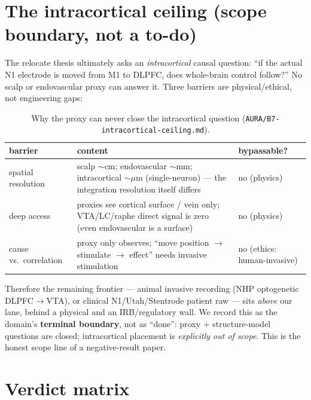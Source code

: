 \documentclass[11pt,a4paper]{article}
\begin{document}
\section{The intracortical ceiling (scope boundary, not a to-do)}
\label{sec:ceiling}

The relocate thesis ultimately asks an \emph{intracortical} causal question:
``if the actual N1 electrode is moved from M1 to DLPFC, does whole-brain
control follow?'' No scalp or endovascular proxy can answer it. Three barriers
are physical/ethical, not engineering gaps:

\begin{table}[h]
\centering
\caption{Why the proxy can never close the intracortical question
(\texttt{AURA/B7-intracortical-ceiling.md}).}
\label{tab:ceiling}
\small
\begin{tabular}{@{}lp{7.2cm}l@{}}
\toprule
barrier & content & bypassable? \\
\midrule
spatial resolution & scalp $\sim$cm; endovascular $\sim$mm; intracortical
$\sim\mu$m (single-neuron) --- the integration resolution itself differs &
no (physics) \\
deep access & proxies see cortical surface / vein only; VTA/LC/raphe direct
signal is zero (even endovascular is a surface) & no (physics) \\
cause vs.\ correlation & proxy only observes; ``move position $\to$ stimulate
$\to$ effect'' needs invasive stimulation & no (ethics: human-invasive) \\
\bottomrule
\end{tabular}
\end{table}

\noindent
Therefore the remaining frontier --- animal invasive recording
(NHP optogenetic DLPFC$\to$VTA), or clinical N1/Utah/Stentrode patient raw ---
sits \emph{above} our lane, behind a physical and an IRB/regulatory wall. We
record this as the domain's \textbf{terminal boundary}, not as ``done'':
proxy + structure-model questions are closed; intracortical placement is
\emph{explicitly out of scope}. This is the honest scope line of a
negative-result paper.

\section{Verdict matrix}\label{sec:verdicts}
\end{document}
